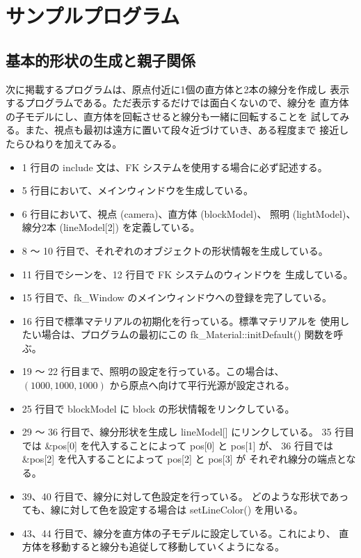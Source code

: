 \chapter{サンプルプログラム} \label{chap:sample}
\section{基本的形状の生成と親子関係}
次に掲載するプログラムは、原点付近に1個の直方体と2本の線分を作成し
表示するプログラムである。ただ表示するだけでは面白くないので、線分を
直方体の子モデルにし、直方体を回転させると線分も一緒に回転することを
試してみる。また、視点も最初は遠方に置いて段々近づけていき、ある程度まで
接近したらひねりを加えてみる。

\begin{itemize}
 \item 1 行目の include 文は、FK システムを使用する場合に必ず記述する。
 \item 5 行目において、メインウィンドウを生成している。
 \item 6 行目において、視点 (camera)、直方体 (blockModel)、
	照明 (lightModel)、線分2本 (lineModel[2]) を定義している。
 \item 8 〜 10 行目で、それぞれのオブジェクトの形状情報を生成している。
 \item 11 行目でシーンを、12 行目で FK システムのウィンドウを
	生成している。
 \item 15 行目で、fk\_Window のメインウィンドウへの登録を完了している。
 \item 16 行目で標準マテリアルの初期化を行っている。標準マテリアルを
	使用したい場合は、プログラムの最初にこの
	fk\_Material::initDefault() 関数を呼ぶ。
 \item 19 〜 22 行目まで、照明の設定を行っている。この場合は、
	\((1000, 1000, 1000)\) から原点へ向けて平行光源が設定される。
 \item 25 行目で blockModel に block の形状情報をリンクしている。
 \item 29 〜 36 行目で、線分形状を生成し lineModel[] にリンクしている。
	35 行目では \&pos[0] を代入することによって pos[0] と pos[1] が、
	36 行目では \&pos[2] を代入することによって pos[2] と pos[3] が
	それぞれ線分の端点となる。
 \item 39、40 行目で、線分に対して色設定を行っている。
	どのような形状であっても、線に対して色を設定する場合は
	setLineColor() を用いる。
 \item 43、44 行目で、線分を直方体の子モデルに設定している。これにより、
	直方体を移動すると線分も追従して移動していくようになる。

\end{itemize}

